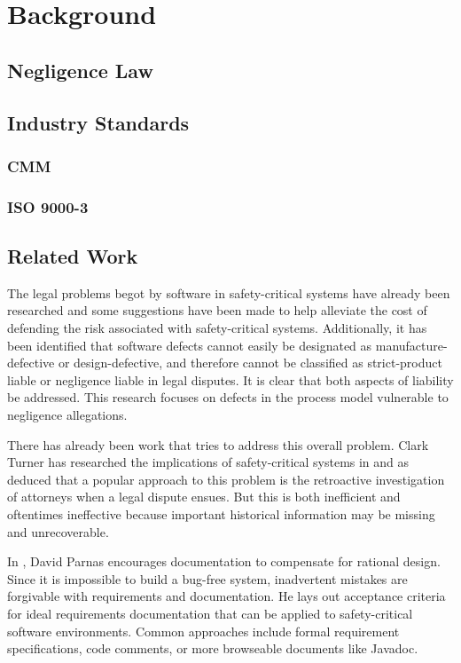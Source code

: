 \section{Background}

\subsection{Negligence Law}

\subsection{Industry Standards}
\subsubsection*{CMM}
\subsubsection*{ISO 9000-3}

\subsection{Related Work}
The legal problems begot by software in safety-critical systems have already
been researched \cite{Turner1996, Turner2000} and some suggestions have been
made to help alleviate the cost of defending the risk associated with
safety-critical systems\cite{Turner2001}. Additionally, it has been identified
that software defects cannot easily be designated as manufacture-defective or
design-defective\cite{Turner2000}, and therefore cannot be classified as
strict-product liable or negligence liable in legal disputes. It is clear that
both aspects of liability be addressed. This research focuses on defects in the
process model vulnerable to negligence allegations.

There has already been work that tries to address this overall problem. Clark
Turner has researched the implications of safety-critical systems in
\cite{Turner1996, Turner2000, Turner2001} and as deduced that a popular
approach to this problem is the retroactive investigation of attorneys when a
legal dispute ensues. But this is both inefficient and oftentimes ineffective
because important historical information may be missing and unrecoverable.

In \cite{Parnas1986}, David Parnas encourages documentation to compensate for
rational design. Since it is impossible to build a bug-free system, inadvertent
mistakes are forgivable with requirements and documentation. He lays out
acceptance criteria for ideal requirements documentation that can be applied to
safety-critical software environments. Common approaches include formal
requirement specifications, code comments, or more browseable documents like
Javadoc\cite{Javadoc}.
